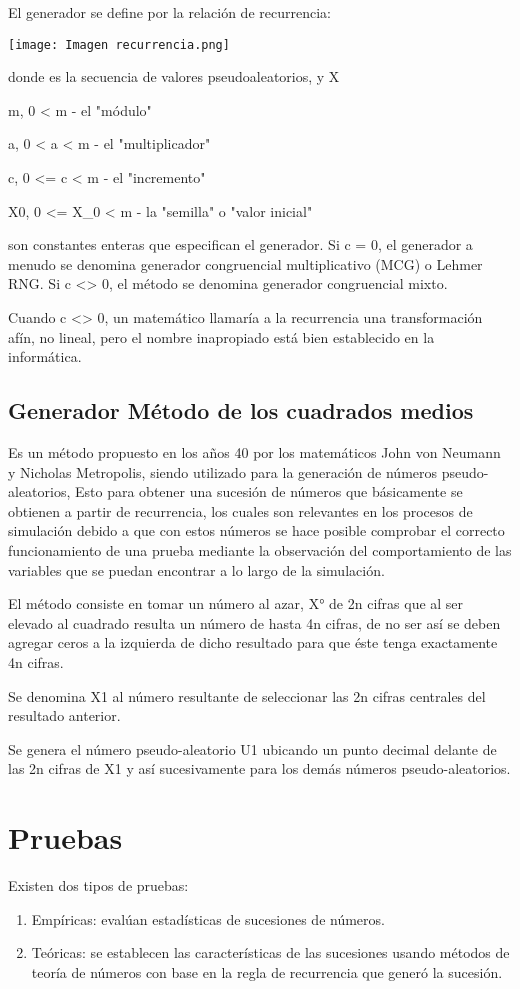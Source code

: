 \documentclass{article}
\begin{document}
El generador se define por la relación de recurrencia:
\begin{center}
    \texttt{[image: Imagen recurrencia.png]}
\end{center}
donde es la secuencia de valores pseudoaleatorios, y X

m, 0 < m - el "módulo"

a, 0 < a < m - el "multiplicador"

c, 0 <= c < m - el "incremento"

X0, 0  <=  X_0 < m - la "semilla" o "valor inicial"
    
son constantes enteras que especifican el generador. Si c  = 0, el generador a menudo se denomina generador congruencial multiplicativo (MCG) o Lehmer RNG. Si c <> 0, el método se denomina generador congruencial mixto. 

Cuando c <> 0, un matemático llamaría a la recurrencia una transformación afín, no lineal, pero el nombre inapropiado está bien establecido en la informática.

\subsection{Generador Método de los cuadrados medios}
Es un método propuesto en los años 40 por los matemáticos John von Neumann y Nicholas Metropolis, siendo utilizado para la generación de números pseudo-aleatorios, Esto para obtener una sucesión de números que básicamente se obtienen a partir de recurrencia, los cuales son relevantes en los procesos de simulación debido a que con estos números se hace posible comprobar el correcto funcionamiento de una prueba mediante la observación del comportamiento de las variables que se puedan encontrar a lo largo de la simulación.

El método consiste en tomar un número al azar, X° de 2n cifras que al ser elevado al cuadrado resulta un número de hasta 4n cifras, de no ser así se deben agregar ceros a la izquierda de dicho resultado para que éste tenga exactamente 4n cifras.

Se denomina X1 al número resultante de seleccionar las 2n cifras centrales del resultado anterior.

Se genera el número pseudo-aleatorio U1 ubicando un punto decimal delante de las 2n cifras de X1 y así sucesivamente para los demás números pseudo-aleatorios.
\section{Pruebas}
\label{sec:others}
Existen dos tipos de pruebas:
\begin{enumerate}
\item Empíricas: evalúan estadísticas de sucesiones de números.
\item Teóricas: se establecen las características de las sucesiones usando métodos de teoría de números con base en la regla de recurrencia que generó la sucesión.
\end{enumerate}
\end{document}
